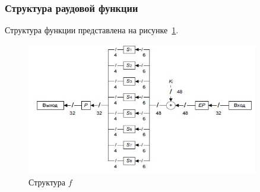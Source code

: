 \documentclass[a4paper, 14pt]{extarticle}
\begin{document}
\FloatBarrier{}

\subsubsection{Структура раудовой функции}
Структура функции представлена на рисунке~\ref{img:1:2}.
\begin{figure}[h]
    \centering
    \includegraphics[width=0.9\textwidth]{./img/S002.jpg}
    \caption{Структура $f$}%
    \label{img:1:2}
\end{figure}
\end{document}
